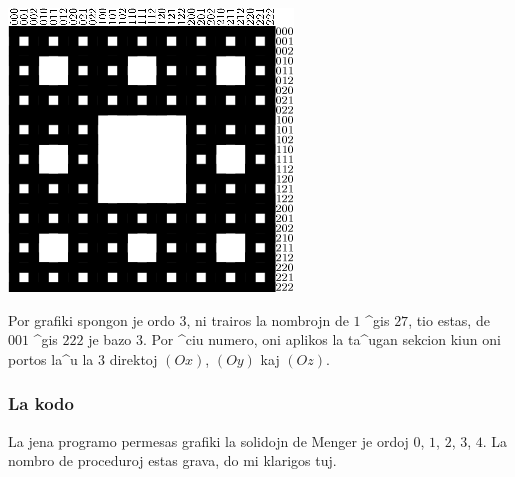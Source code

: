 \begin{center}
\includegraphics{bildoj/menger-schema10.png}\\ 
\end{center}

Por grafiki spongon je ordo $3$, ni trairos la nombrojn de $1$ ^gis
$27$, tio estas, de $001$ ^gis $222$ je bazo $3$.  Por ^ciu numero,
oni aplikos la ta^ugan sekcion kiun oni portos la^u la $3$ direktoj
$(Ox)$, $(Oy)$ kaj $(Oz)$.

\subsubsection{La kodo}

La jena programo permesas grafiki la solidojn de Menger je ordoj $0$,
$1$, $2$, $3$, $4$.  La nombro de proceduroj estas grava, do mi
klarigos tuj.

